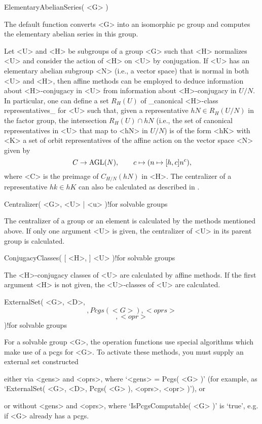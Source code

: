 \>ElementaryAbelianSeries( <G> )

The default  function converts   <G> into an   isomorphic pc   group  and
computes the elementary abelian series in this group.


Let <U> and <H> be subgroups of a group <G>  such that <H> normalizes <U>
and consider the   action of <H> on  <U>  by conjugation. If   <U> has an
elementary abelian subgroup <N> (i.e., a vector space)  that is normal in
both  <U> and   <H>, then  affine   methods  can  be employed to   deduce
information   about   <H>-conjugacy    in  <U>  from   information  about
<H>-conjugacy in $U/N$.  In particular, one  can define a set $R_H(U)$ of
_canonical <H>-class    representatives_   for <U>  such  that,  given  a
representative  $hN\in  R_H(U/N)$ in  the  factor group, the intersection
$R_H(U) \cap hN$ (i.e., the set  of canonical representatives in <U> that
map  to <hN>  in  $U/N$) is of   the form <hK>   with <K> a set of  orbit
representatives of the affine action on the vector space <N> given by
$$ C \to {\rm AGL}(N), \qquad c \mapsto ( n \mapsto [h,c] n^c ), $$
where <C> is the preimage  of $C_{H/N}(hN)$ in  <H>. The centralizer of a
representative  $hk  \in  hK$  can also  be   calculated  as described in
\cite{MeckyNeubuser89}.

\>Centralizer( <G>, <U> | <u> )!{for solvable groups}

The centralizer of a  group or an element   is calculated by  the methods
mentioned  above. If only one argument  <U> is given,  the centralizer of
<U> in its parent group is calculated.

\>ConjugacyClasses( [ <H>, ] <U> )!{for solvable groups}

The <H>-conjugacy classes of <U> are calculated by affine methods. If the
first argument <H> is not given, the <U>-classes of <U> are calculated.


\>ExternalSet( <G>, <D>, \[, {Pcgs( <G> )}, <oprs> \] \[, <opr> \] )!{for
solvable groups}

For a solvable group <G>, the  operation functions use special algorithms
which make use of  a pcgs for  <G>. To activate  these methods, you  must
supply an external set constructed
\medskip
\item
  either via <gens>    and <oprs>, where `<gens>   =  Pcgs( <G>  )'  (for
  example, as `ExternalSet( <G>, <D>, Pcgs( <G> ), <oprs>, <opr> )'), or
\item
  or without   <gens> and  <oprs>, where   `IsPcgsComputable(  <G> )'  is
  `true', e.g. if <G> already has a pcgs.

